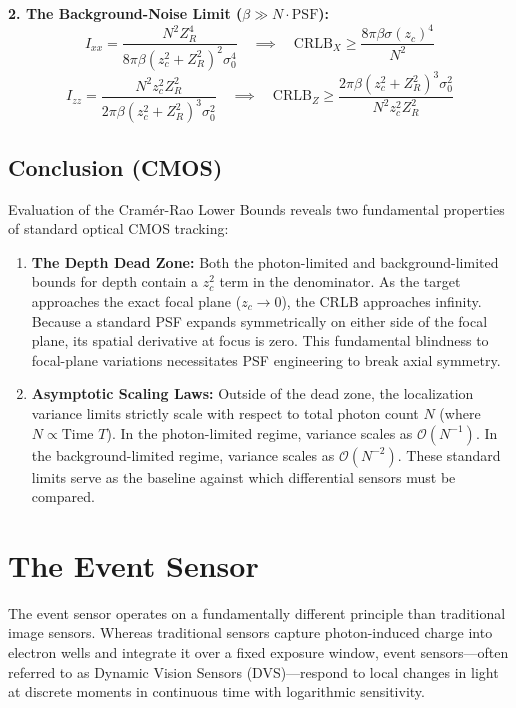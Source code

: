 \documentclass[11pt]{article}
\begin{document}
\vspace{0.5em}
\noindent \textbf{2. The Background-Noise Limit ($\beta \gg N \cdot \text{PSF}$):}
\begin{equation}
I_{xx} = \frac{N^2 Z_R^4}{8\pi \beta (z_c^2 + Z_R^2)^2 \sigma_0^4} \quad \implies \quad \text{CRLB}_X \ge \frac{8\pi \beta \sigma(z_c)^4}{N^2}
\end{equation}
\begin{equation}
I_{zz} = \frac{N^2 z_c^2 Z_R^2}{2\pi \beta (z_c^2 + Z_R^2)^3 \sigma_0^2} \quad \implies \quad \text{CRLB}_Z \ge \frac{2\pi \beta (z_c^2 + Z_R^2)^3 \sigma_0^2}{N^2 z_c^2 Z_R^2}
\end{equation}

\subsection{Conclusion (CMOS)}
Evaluation of the Cramér-Rao Lower Bounds reveals two fundamental properties of standard optical CMOS tracking:

\begin{enumerate}
    \item \textbf{The Depth Dead Zone:} Both the photon-limited and background-limited bounds for depth contain a $z_c^2$ term in the denominator. As the target approaches the exact focal plane ($z_c \to 0$), the CRLB approaches infinity. Because a standard PSF expands symmetrically on either side of the focal plane, its spatial derivative at focus is zero. This fundamental blindness to focal-plane variations necessitates PSF engineering to break axial symmetry.
    \item \textbf{Asymptotic Scaling Laws:} Outside of the dead zone, the localization variance limits strictly scale with respect to total photon count $N$ (where $N \propto \text{Time } T$). In the photon-limited regime, variance scales as $\mathcal{O}(N^{-1})$. In the background-limited regime, variance scales as $\mathcal{O}(N^{-2})$. These standard limits serve as the baseline against which differential sensors must be compared.
\end{enumerate}


\section{The Event Sensor}

The event sensor operates on a fundamentally different principle than traditional image sensors. Whereas traditional sensors capture photon-induced charge into electron wells and integrate it over a fixed exposure window, event sensors—often referred to as Dynamic Vision Sensors (DVS)—respond to local changes in light at discrete moments in continuous time with logarithmic sensitivity. 
\end{document}
